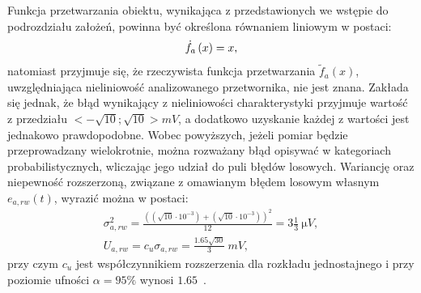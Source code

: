 Funkcja przetwarzania obiektu, wynikająca z przedstawionych we wstępie do podrozdziału założeń, powinna być określona równaniem liniowym w postaci:
\begin{equation}
\dot{f}_{a} \left(x\right) = x \label{eq:sym_parta_statfun},
\end{equation}
natomiast przyjmuje się, że rzeczywista funkcja przetwarzania $\tilde{f}_{a}(x)$, uwzględniająca nieliniowość analizowanego przetwornika, nie jest znana. Zakłada się jednak, że błąd wynikający z nieliniowości charakterystyki przyjmuje wartość z przedziału $<-\sqrt{10};\sqrt{10}>\unit{mV}$, a dodatkowo uzyskanie każdej z wartości jest jednakowo prawdopodobne. Wobec powyższych, jeżeli pomiar będzie przeprowadzany wielokrotnie, można rozważany błąd opisywać w kategoriach probabilistycznych, wliczając jego udział do puli błędów losowych. Wariancję oraz niepewność rozszerzoną, związane z omawianym błędem losowym własnym $e_{a,rw}(t)$, wyrazić można w postaci:
\begin{gather}
\sigma_{a,rw}^{2} = \frac{\left( \left( \sqrt{10} \cdot 10^{-3} \right) + \left( \sqrt{10} \cdot 10^{-3} \right) \right)^{2}}{12} = 3 \frac{1}{3}~\unit{\micro V} \label{eq:sym_parta_rand_self_var}, \\
U_{a,rw} = c_{u} \sigma_{a,rw} = \frac{1.65 \sqrt{30}}{3}~\unit{mV} \label{eq:sym_parta_rand_self_unc},
\end{gather}
przy czym $c_{u}$ jest współczynnikiem rozszerzenia dla rozkładu jednostajnego i przy poziomie ufności $\alpha = 95\%$ wynosi $1.65$~\cite{jcgm_guide}.

